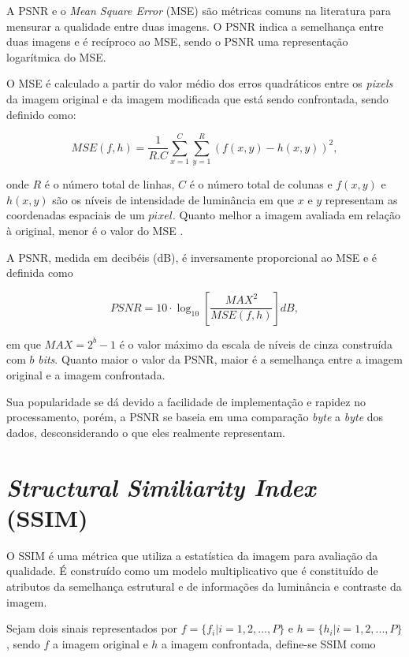 A PSNR e o \textit{Mean Square Error} (MSE) são métricas comuns na literatura para mensurar a qualidade entre duas imagens. O PSNR indica a semelhança entre duas imagens e é recíproco ao MSE, sendo o PSNR uma representação logarítmica do MSE.

O MSE é calculado a partir do valor médio dos erros quadráticos entre os \textit{pixels} da imagem original e da imagem modificada que está sendo confrontada, sendo definido como:

\begin{equation}\label{eq:psnr1}
    MSE(f,h) = \frac{1}{R . C}\sum_{x=1}^{C}\sum_{y=1}^{R}(f(x,y) - h(x,y))^2,
\end{equation}

onde $R$ é o número total de linhas, $C$ é o número total de colunas e $f(x,y)$ e $h(x,y)$ são os níveis de intensidade de luminância em que $x$ e $y$ representam as coordenadas espaciais de um $pixel$. Quanto melhor a imagem avaliada em relação à original, menor é o valor do MSE \cite{Regis2015}.

A PSNR, medida em decibéis (dB), é inversamente proporcional ao MSE e é definida como

\begin{equation}\label{eq:psnr2}
    PSNR = 10 \cdot {\log_{10} \left[ \frac{{MAX}^2}{MSE(f,h)} \right] } dB,
\end{equation}

em que $MAX = 2^b-1$ é o valor máximo da escala de níveis de cinza construída com $b$ \textit{bits}. Quanto maior o valor da PSNR, maior é a semelhança entre a imagem original e a imagem confrontada.

Sua popularidade se dá devido a facilidade de implementação e rapidez no processamento, porém, a PSNR se baseia em uma comparação \textit{byte} a \textit{byte} dos dados, desconsiderando o que eles realmente representam.


\section{\textit{Structural Similiarity Index} (SSIM)}

O SSIM é uma métrica que utiliza a estatística da imagem para avaliação da qualidade. É construído como um modelo multiplicativo que é constituído de atributos da semelhança estrutural e de informações da luminância e contraste da imagem. 

Sejam dois sinais representados por $f = \{f_i|i = 1, 2, ...,P\}$ e $h = \{h_i|i = 1, 2, ...,P\}$, sendo $f$ a imagem original e $h$ a imagem confrontada, define-se SSIM como

